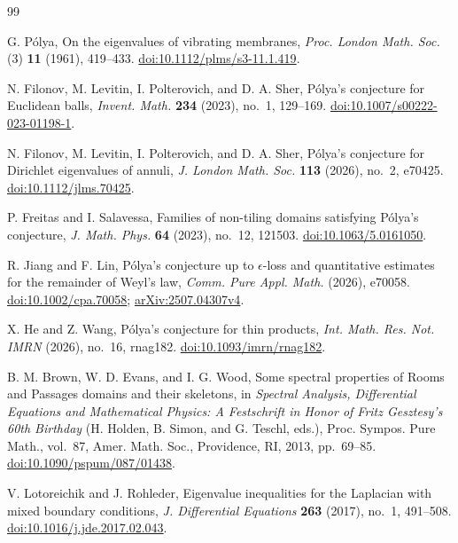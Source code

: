 \documentclass[11pt,reqno]{amsart}
\numberwithin{equation}{section}
\begin{document}
\begin{thebibliography}{99}

G. P\'olya,
On the eigenvalues of vibrating membranes,
\emph{Proc. London Math. Soc.} (3) \textbf{11} (1961), 419--433.
\href{https://doi.org/10.1112/plms/s3-11.1.419}{doi:10.1112/plms/s3-11.1.419}.

N. Filonov, M. Levitin, I. Polterovich, and D. A. Sher,
P\'olya's conjecture for Euclidean balls,
\emph{Invent. Math.} \textbf{234} (2023), no.~1, 129--169.
\href{https://doi.org/10.1007/s00222-023-01198-1}{doi:10.1007/s00222-023-01198-1}.

N. Filonov, M. Levitin, I. Polterovich, and D. A. Sher,
P\'olya's conjecture for Dirichlet eigenvalues of annuli,
\emph{J. London Math. Soc.} \textbf{113} (2026), no.~2, e70425.
\href{https://doi.org/10.1112/jlms.70425}{doi:10.1112/jlms.70425}.

P. Freitas and I. Salavessa,
Families of non-tiling domains satisfying P\'olya's conjecture,
\emph{J. Math. Phys.} \textbf{64} (2023), no.~12, 121503.
\href{https://doi.org/10.1063/5.0161050}{doi:10.1063/5.0161050}.

R. Jiang and F. Lin,
P\'olya's conjecture up to $\epsilon$-loss and quantitative estimates
for the remainder of Weyl's law,
\emph{Comm. Pure Appl. Math.} (2026), e70058.
\href{https://doi.org/10.1002/cpa.70058}{doi:10.1002/cpa.70058};
\href{https://arxiv.org/abs/2507.04307v4}{arXiv:2507.04307v4}.

X. He and Z. Wang,
P\'olya's conjecture for thin products,
\emph{Int. Math. Res. Not. IMRN} (2026), no.~16, rnag182.
\href{https://doi.org/10.1093/imrn/rnag182}{doi:10.1093/imrn/rnag182}.

B. M. Brown, W. D. Evans, and I. G. Wood,
Some spectral properties of Rooms and Passages domains and their skeletons,
in \emph{Spectral Analysis, Differential Equations and Mathematical Physics:
A Festschrift in Honor of Fritz Gesztesy's 60th Birthday}
(H. Holden, B. Simon, and G. Teschl, eds.),
Proc. Sympos. Pure Math., vol.~87, Amer. Math. Soc., Providence, RI,
2013, pp.~69--85.
\href{https://doi.org/10.1090/pspum/087/01438}{doi:10.1090/pspum/087/01438}.

V. Lotoreichik and J. Rohleder,
Eigenvalue inequalities for the Laplacian with mixed boundary conditions,
\emph{J. Differential Equations} \textbf{263} (2017), no.~1, 491--508.
\href{https://doi.org/10.1016/j.jde.2017.02.043}{doi:10.1016/j.jde.2017.02.043}.


\end{thebibliography}
\end{document}
